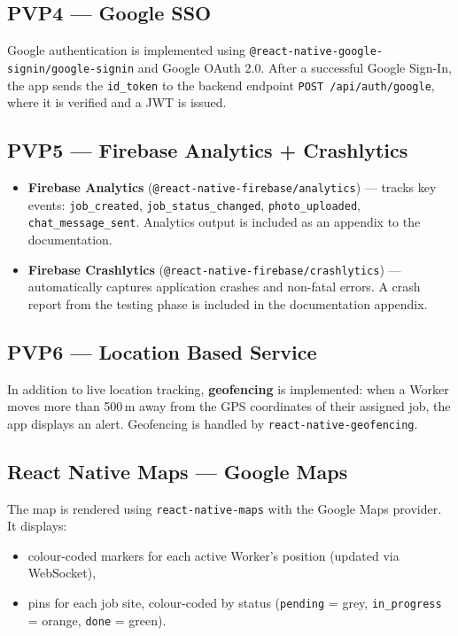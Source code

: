 \subsection{PVP4 --- Google SSO}
Google authentication is implemented using \texttt{@react-native-google-signin/google-signin} and Google OAuth 2.0. After a successful Google Sign-In, the app sends the \texttt{id\_token} to the backend endpoint \texttt{POST /api/auth/google}, where it is verified and a JWT is issued.

\subsection{PVP5 --- Firebase Analytics + Crashlytics}
\begin{itemize}
  \item \textbf{Firebase Analytics} (\texttt{@react-native-firebase/analytics}) --- tracks key events: \texttt{job\_created}, \texttt{job\_status\_changed}, \texttt{photo\_uploaded}, \texttt{chat\_message\_sent}. Analytics output is included as an appendix to the documentation.
  \item \textbf{Firebase Crashlytics} (\texttt{@react-native-firebase/crashlytics}) --- automatically captures application crashes and non-fatal errors. A crash report from the testing phase is included in the documentation appendix.
\end{itemize}

\subsection{PVP6 --- Location Based Service}
In addition to live location tracking, \textbf{geofencing} is implemented: when a Worker moves more than 500\,m away from the GPS coordinates of their assigned job, the app displays an alert. Geofencing is handled by \texttt{react-native-geofencing}.

\subsection{React Native Maps --- Google Maps}
The map is rendered using \texttt{react-native-maps} with the Google Maps provider. It displays:
\begin{itemize}
  \item colour-coded markers for each active Worker's position (updated via WebSocket),
  \item pins for each job site, colour-coded by status (\texttt{pending} = grey, \texttt{in\_progress} = orange, \texttt{done} = green).
\end{itemize}